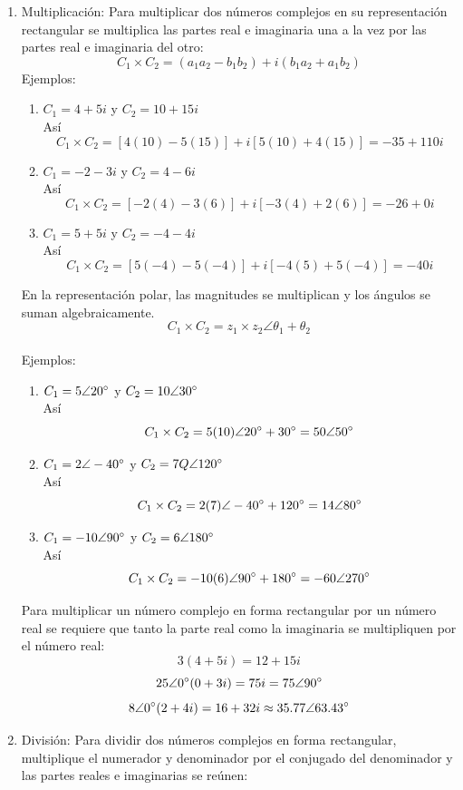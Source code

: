 \documentclass[a4paper,12pt]{article}
\begin{document}
\begin{enumerate}
\begin{enumerate}
	\item Multiplicación: Para multiplicar dos números complejos en su representación rectangular se multiplica las partes real e imaginaria una a la vez por las partes real e imaginaria del otro: 
	\[C_1 \times C_2 = (a_1 a_2 - b_1 b_2) + i(b_1 a_2 + a_1 b_2)\]
	Ejemplos:\\
		\begin{enumerate}
			\item $C_1 = 4+5i$ y $C_2 = 10+15i$ \\
			Así \[C_1 \times C_2 = [4(10) - 5(15)] + i[5(10) + 4(15)] = -35 + 110i\]
			\item $C_1 = -2-3i$ y $C_2 = 4-6i$ \\
			Así \[C_1 \times C_2 = [-2(4) - 3(6)] + i[-3(4) + 2(6)] = -26 + 0i\]
			\item $C_1 = 5+5i$ y $C_2 = -4-4i$ \\
			Así \[C_1 \times C_2 = [5(-4) - 5(-4)] + i[-4(5) + 5(-4)] = -40i\]
		\end{enumerate}
	En la representación polar, las magnitudes se multiplican y los ángulos se suman algebraicamente.
	\[C_1 \times C_2 = z_1 \times z_2 \angle {\theta}_1 + {\theta}_2\] \\
	Ejemplos:\\
		\begin{enumerate}
			\item $C_1 = 5 \angle 20\degree$ y $C_2 = 10 \angle 30\degree$ \\
			Así \[C_1 \times C_2 = 5(10) \angle 20\degree + 30\degree = 50 \angle 50\degree\]
			\item $C_1 = 2 \angle -40\degree$ y $C_2 = 7 Q\angle 120\degree$ \\
			Así \[C_1 \times C_2 = 2(7) \angle -40\degree + 120\degree = 14 \angle 80\degree\]
			\item $C_1 = -10 \angle 90\degree$ y $C_2 = 6 \angle 180\degree$ \\
			Así \[C_1 \times C_2 = -10(6) \angle 90\degree + 180\degree = -60 \angle 270\degree\]
		\end{enumerate}
	Para multiplicar un número complejo en forma rectangular por un número real se requiere que tanto la parte real como la imaginaria se multipliquen por el número real: \\
	\[3(4 + 5i) = 12 + 15i\]
	\[25 \angle 0\degree (0 + 3i) = 75i = 75 \angle 90\degree\]
	\[8 \angle 0\degree (2 + 4i) = 16 + 32i \approx 35.77 \angle 63.43\degree\]

	\item División: Para dividir dos números complejos en forma rectangular, multiplique el numerador y denominador por el conjugado del denominador y las partes reales e imaginarias se reúnen:


\end{enumerate}
\end{enumerate}
\end{document}
